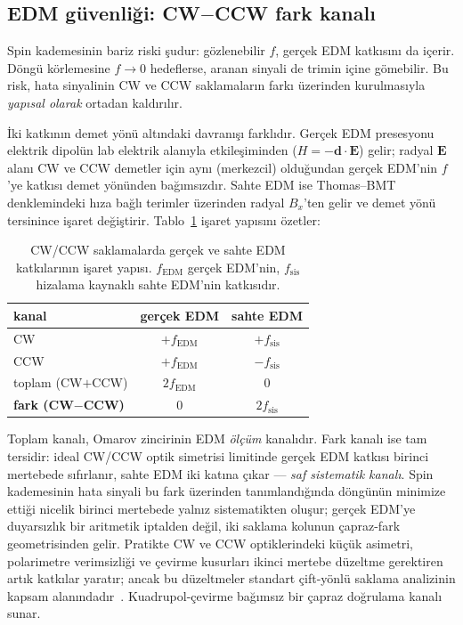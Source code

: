 \documentclass[preprint,12pt]{elsarticle}
\begin{document}
\subsection{EDM güvenliği: CW$-$CCW fark kanalı}
\label{sec:edm-guvenlik}

Spin kademesinin bariz riski şudur: gözlenebilir $f$, gerçek EDM
katkısını da içerir. Döngü körlemesine $f\to0$ hedeflerse, aranan
sinyali de trimin içine gömebilir. Bu risk, hata sinyalinin CW ve CCW
saklamaların farkı üzerinden kurulmasıyla \emph{yapısal olarak}
ortadan kaldırılır.

İki katkının demet yönü altındaki davranışı farklıdır. Gerçek EDM
presesyonu elektrik dipolün lab elektrik alanıyla etkileşiminden
($H=-\mathbf{d}\cdot\mathbf{E}$) gelir; radyal $\mathbf{E}$ alanı CW
ve CCW demetler için aynı (merkezcil) olduğundan gerçek EDM'nin
$f$'ye katkısı demet yönünden bağımsızdır. Sahte EDM ise Thomas--BMT
denklemindeki hıza bağlı terimler üzerinden radyal $B_x$'ten gelir ve
demet yönü tersinince işaret değiştirir. Tablo~\ref{tab:cwccw} işaret
yapısını özetler:

\begin{table}[htb]
\centering
\caption{CW/CCW saklamalarda gerçek ve sahte EDM katkılarının işaret
yapısı. $f_\mathrm{EDM}$ gerçek EDM'nin, $f_\mathrm{sis}$ hizalama
kaynaklı sahte EDM'nin katkısıdır.}
\begin{tabular}{lcc}
\toprule
kanal & gerçek EDM & sahte EDM \\
\midrule
CW                    & $+f_\mathrm{EDM}$  & $+f_\mathrm{sis}$ \\
CCW                   & $+f_\mathrm{EDM}$  & $-f_\mathrm{sis}$ \\
toplam (CW$+$CCW)     & $2f_\mathrm{EDM}$  & $0$ \\
\textbf{fark (CW$-$CCW)} & $0$ & $2f_\mathrm{sis}$ \\
\bottomrule
\end{tabular}
\label{tab:cwccw}
\end{table}

Toplam kanalı, Omarov zincirinin EDM \emph{ölçüm} kanalıdır. Fark
kanalı ise tam tersidir: ideal CW/CCW optik simetrisi limitinde gerçek
EDM katkısı birinci mertebede sıfırlanır, sahte EDM iki katına çıkar
--- \emph{saf sistematik kanalı}. Spin kademesinin hata sinyali bu
fark üzerinden tanımlandığında döngünün minimize ettiği nicelik birinci
mertebede yalnız sistematikten oluşur; gerçek EDM'ye duyarsızlık bir
aritmetik iptalden değil, iki saklama kolunun çapraz-fark geometrisinden
gelir. Pratikte CW ve CCW optiklerindeki küçük asimetri, polarimetre
verimsizliği ve çevirme kusurları ikinci mertebe düzeltme gerektiren
artık katkılar yaratır; ancak bu düzeltmeler standart çift-yönlü
saklama analizinin kapsam alanındadır~\cite{todo-omarov}.
Kuadrupol-çevirme bağımsız bir çapraz doğrulama kanalı sunar.
\end{document}
